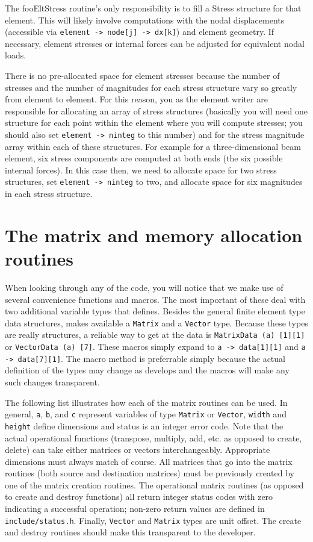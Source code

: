 The fooEltStress routine's only responsibility is to fill
a Stress structure for that element.  This will likely involve 
computations with the nodal displacements (accessible via 
\mbox{{\tt element -> node[j] -> dx[k]}}) and element geometry.  If necessary,
element stresses or internal forces can be adjusted for equivalent nodal
loads.  

There is no pre-allocated space for element stresses because
the number of stresses and the number of magnitudes for each stress
structure vary so greatly from element to element.  For this reason,
you as the element writer are responsible for allocating an array of
stress structures (basically you will need one structure for each 
point within the element where you will compute stresses; you should
also set \mbox{{\tt element -> ninteg}} to this number) and for
the stress magnitude array within each of these structures.  For example
for a three-dimensional beam element, six stress components are computed
at both ends (the six possible internal forces).  In this case then,
we need to allocate space for two stress structures, set 
\mbox{{\tt element -> ninteg}} to two, and allocate space for six magnitudes
in each stress structure.

\section{The \felt{} matrix and memory allocation routines}

When looking through any of the \felt{} code, you will notice that
we make use of several convenience functions and macros.  The most
important of these deal with two additional variable types that \felt{} defines.
Besides the general finite element type data structures, \felt{} makes 
available a {\tt Matrix} and a {\tt Vector} type.  Because these
types are really structures, a reliable way to get at the data is 
\mbox{{\tt MatrixData (a) [1][1]}} or \mbox{{\tt VectorData (a) [7]}}.  These 
macros simply expand to \mbox{{\tt a -> data[1][1]}} and 
\mbox{{\tt a -> data[7][1]}}.  The macro method is preferrable simply because
the actual definition of the types may change as \felt{} develops and the 
macros will make any such changes transparent.

The following list illustrates how each of the matrix routines can
be used.  In general, {\tt a}, {\tt b}, and {\tt c} represent variables
of type {\tt Matrix} or {\tt Vector}, {\tt width} and {\tt height} define 
dimensions and status is an integer error code. Note that
the actual operational functions (transpose, multiply, add, etc. as opposed to
create, delete) can take either matrices or vectors interchangeably.  
Appropriate dimensions must always match of course.  All matrices that
go into the matrix routines (both source and destination matrices) must
be previously created by one of the matrix creation routines.  The operational
matrix routines (as opposed to create and destroy functions) all return 
integer status codes with zero indicating a successful operation; non-zero
return values are defined in {\tt include/status.h}.  
Finally, {\tt Vector} and {\tt Matrix} types are unit offset.  The create and 
destroy routines should make this transparent to the developer.


